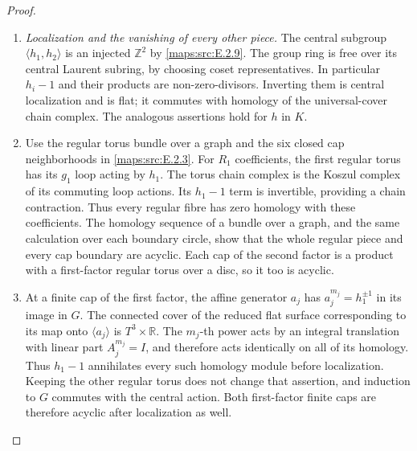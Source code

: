 \begin{proof}
\begin{enumerate}[label={$\langle1\rangle$\arabic*.},leftmargin=*]
\item \emph{Localization and the vanishing of every other piece.}
The central subgroup $\langle h_1,h_2\rangle$ is an injected
$\mathbb Z^2$ by \ref{maps:src:E.2.9}. The group ring is free over its central
Laurent subring, by choosing coset representatives. In particular
$h_i-1$ and their products are non-zero-divisors. Inverting them
is central localization and is flat; it commutes with homology
of the universal-cover chain complex. The analogous assertions
hold for $h$ in $K$.

\item Use the regular torus bundle over a graph and the six closed
cap neighborhoods in \ref{maps:src:E.2.3}. For $R_1$ coefficients, the first
regular torus has its $g_1$ loop acting by $h_1$. The torus
chain complex is the Koszul complex of its commuting loop
actions. Its $h_1-1$ term is invertible, providing a chain
contraction. Thus every regular fibre has zero homology with
these coefficients. The homology sequence of a bundle over
a graph, and the same calculation over each boundary circle,
show that the whole regular piece and every cap boundary are
acyclic. Each cap of the second factor is a product with a
first-factor regular torus over a disc, so it too is acyclic.

\item At a finite cap of the first factor, the affine generator
$a_j$ has $a_j^{m_j}=h_1^{\pm1}$ in its image in $G$.
The connected cover of the reduced flat surface corresponding
to its map onto $\langle a_j\rangle$ is $T^3\times\mathbb R$.
The $m_j$-th power acts by an integral translation with linear
part $A_j^{m_j}=I$, and therefore acts identically on all of
its homology. Thus $h_1-1$ annihilates every such homology
module before localization. Keeping the other regular torus does not change that assertion, and induction to $G$ commutes
with the central action. Both first-factor finite caps are
therefore acyclic after localization as well. 


\end{enumerate}
\end{proof}
